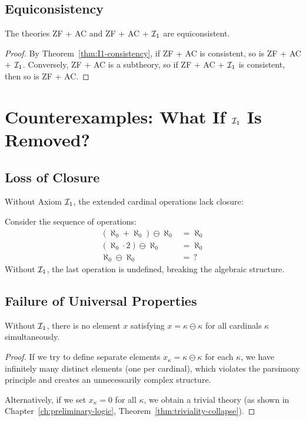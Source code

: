 \subsection{Equiconsistency}

\begin{corollary}[Equiconsistency]
The theories ZF + AC and ZF + AC + $\mathcal{I}_1$ are equiconsistent.
\end{corollary}

\begin{proof}
By Theorem~\ref{thm:I1-consistency}, if ZF + AC is consistent, so is ZF + AC + $\mathcal{I}_1$. Conversely, ZF + AC is a subtheory, so if ZF + AC + $\mathcal{I}_1$ is consistent, then so is ZF + AC.
\end{proof}

\section{Counterexamples: What If $\mathcal{I}_1$ Is Removed?}

\subsection{Loss of Closure}

Without Axiom $\mathcal{I}_1$, the extended cardinal operations lack closure:

\begin{example}
Consider the sequence of operations:
\begin{align*}
    (\aleph_0 + \aleph_0) \ominus \aleph_0 &= \aleph_0 \\
    (\aleph_0 \cdot 2) \ominus \aleph_0 &= \aleph_0 \\
    \aleph_0 \ominus \aleph_0 &= \, ?
\end{align*}
Without $\mathcal{I}_1$, the last operation is undefined, breaking the algebraic structure.
\end{example}

\subsection{Failure of Universal Properties}

\begin{proposition}
Without $\mathcal{I}_1$, there is no element $x$ satisfying $x = \kappa \ominus \kappa$ for all cardinals $\kappa$ simultaneously.
\end{proposition}

\begin{proof}
If we try to define separate elements $x_\kappa = \kappa \ominus \kappa$ for each $\kappa$, we have infinitely many distinct elements (one per cardinal), which violates the parsimony principle and creates an unnecessarily complex structure.

Alternatively, if we set $x_\kappa = 0$ for all $\kappa$, we obtain a trivial theory (as shown in Chapter~\ref{ch:preliminary-logic}, Theorem~\ref{thm:triviality-collapse}).
\end{proof}

